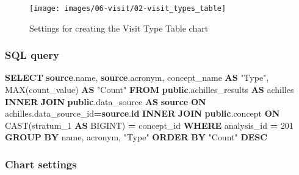 \documentclass[
]{book}
\newenvironment{Shaded}{\begin{snugshade}}{\end{snugshade}}
\newcommand{\DecValTok}[1]{\textcolor[rgb]{0.00,0.00,0.81}{#1}}
\newcommand{\FunctionTok}[1]{\textcolor[rgb]{0.00,0.00,0.00}{#1}}
\newcommand{\KeywordTok}[1]{\textcolor[rgb]{0.13,0.29,0.53}{\textbf{#1}}}
\newcommand{\NormalTok}[1]{#1}
\newcommand{\OperatorTok}[1]{\textcolor[rgb]{0.81,0.36,0.00}{\textbf{#1}}}
\newcommand{\OtherTok}[1]{\textcolor[rgb]{0.56,0.35,0.01}{#1}}
\begin{document}
\begin{figure}
\texttt{[image: images/06-visit/02-visit\_types\_table]} \caption{Settings for creating the Visit Type Table chart}\label{fig:visitTypeTable}
\end{figure}

\hypertarget{sql-query-16}{%
\subsubsection*{SQL query}\label{sql-query-16}}

\begin{Shaded}
\begin{Highlighting}[]
\KeywordTok{SELECT} \KeywordTok{source}\NormalTok{.name,}
       \KeywordTok{source}\NormalTok{.acronym,}
\NormalTok{       concept\_name }\KeywordTok{AS} \OtherTok{"Type"}\NormalTok{,}
       \FunctionTok{MAX}\NormalTok{(count\_value) }\KeywordTok{AS} \OtherTok{"Count"}
\KeywordTok{FROM} \KeywordTok{public}\NormalTok{.achilles\_results }\KeywordTok{AS}\NormalTok{ achilles}
\KeywordTok{INNER} \KeywordTok{JOIN} \KeywordTok{public}\NormalTok{.data\_source }\KeywordTok{AS} \KeywordTok{source} \KeywordTok{ON}\NormalTok{ achilles.data\_source\_id}\OperatorTok{=}\KeywordTok{source}\NormalTok{.}\KeywordTok{id}
\KeywordTok{INNER} \KeywordTok{JOIN} \KeywordTok{public}\NormalTok{.concept }\KeywordTok{ON} \FunctionTok{CAST}\NormalTok{(stratum\_1 }\KeywordTok{AS}\NormalTok{ BIGINT) }\OperatorTok{=}\NormalTok{ concept\_id}
\KeywordTok{WHERE}\NormalTok{ analysis\_id }\OperatorTok{=} \DecValTok{201}
\KeywordTok{GROUP} \KeywordTok{BY}\NormalTok{ name, acronym, }\OtherTok{"Type"}
\KeywordTok{ORDER} \KeywordTok{BY} \OtherTok{"Count"} \KeywordTok{DESC}
\end{Highlighting}
\end{Shaded}

\hypertarget{chart-settings-17}{%
\subsubsection*{Chart settings}\label{chart-settings-17}}
\end{document}
